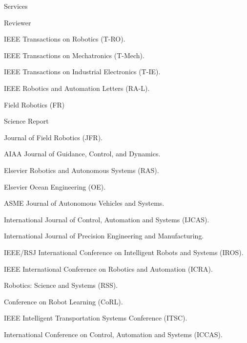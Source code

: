 \begin{rSection}{Services}
\begin{rSubsection}{Reviewer}{}{}{}
  \item IEEE Transactions on Robotics (T-RO).
  \item IEEE Transactions on Mechatronics (T-Mech).
  \item IEEE Transactions on Industrial Electronics (T-IE).
  \item IEEE Robotics and Automation Letters (RA-L).
  \item Field Robotics (FR)
  \item Science Report
  \item Journal of Field Robotics (JFR).
  \item AIAA Journal of Guidance, Control, and Dynamics.
  \item Elsevier Robotics and Autonomous Systems (RAS).
  \item Elsevier Ocean Engineering (OE).
  \item ASME Journal of Autonomous Vehicles and Systems.
  \item International Journal of Control, Automation and Systems (IJCAS).
  \item International Journal of Precision Engineering and Manufacturing.
  \item IEEE/RSJ International Conference on Intelligent Robots and Systems (IROS).
  \item IEEE International Conference on Robotics and Automation (ICRA).
  \item Robotics: Science and Systems (RSS).
  \item Conference on Robot Learning (CoRL).
  \item IEEE Intelligent Transportation Systems Conference (ITSC).
  \item International Conference on Control, Automation and Systems (ICCAS).
\end{rSubsection}


\end{rSection}
